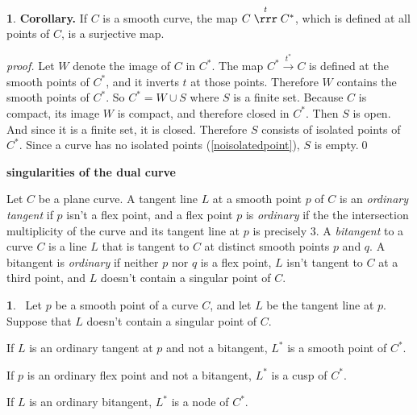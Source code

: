 \documentclass[leqno]{book}
\newcommand\Marginnote[1]{\marginnote{\hspace{-12pt}\normalfont{#1}}}
\renewcommand\theequation{\thesection.\arabic{equation}}
\newenvironment{boldequation}{\renewcommand\theequation{\textbf{\thesection.\arabic{equation}}}\equation}
   {\endequation}
\theoremstyle{definition}%
\numberwithin{equation}{section}
\theoremstyle{theorem} %
\newtheorem{proposition}[equation]{}
\newtheorem{corollary}[equation]{}
\renewenvironment{proof}{\no \emph{proof.}}{}
\begin{document}
\begin{corollary}{\bf Corollary.}
\Marginnote{cstarisimage}\label{cstarisimage}
If $C$ is a smooth curve, the map $C \stackrel t \rrr C^*$, which is
defined at all points of $C$, is a surjective map.\end{corollary}

\begin{proof}  Let $W$ denote the image of $C$ in $C^*$.
  The map $C^* \stackrel{t^*}\longrightarrow C$ is defined at the
  smooth points of $C^*$, and it inverts $t$ at those points.
  Therefore $W$ contains the smooth points of $C^*$.  So $C^* = W \cup
  S$ where $S$ is a finite set.  Because $C$ is  compact, its
  image $W$ is compact, and therefore closed in $C^*$.  Then
  $S$ is open.  And since it is a finite set, it is
  closed.  Therefore $S$ consists of isolated points
  of $C^*$.  Since a curve has no isolated points
  (\ref{noisolatedpoint}), $S$ is empty.\qed\end{proof}

\begin{boldequation}
\Marginnote{singdual}\label{singdual}
 \hspace{-8cm} 
\textbf{singularities of the dual curve}
\end{boldequation}


Let $C$ be a plane curve.  A tangent line $L$ at a
smooth point $p$ of $C$ is an {\it ordinary tangent} if $p$ isn't a flex
point, and a flex point $p$ is {\it ordinary} if the the intersection
multiplicity of the curve and its tangent line at $p$ is precisely
$3$.  A {\it bitangent} to a curve $C$ is a line $L$ that is tangent
to $C$ at distinct smooth points $p$ and $q$. A bitangent is {\it
  ordinary} if neither $p$ nor $q$ is a flex point, $L$ isn't tangent
to $C$ at a third point, and $L$ doesn't contain a singular point of
$C$. 




\begin{proposition}{}\Marginnote{dualcusp}\;\,
Let $p$ be a smooth point of a curve $C$, and let $L$ be the tangent
line at $p$.  Suppose that $L$ doesn't contain a singular point of $C$.

 If $L$ is an ordinary tangent at $p$ and not a bitangent,
 $L^*$ is a smooth point of $C^*$.

 If $p$ is an ordinary flex point and not a bitangent,
 $L^*$ is a cusp of $C^*$.

 If $L$ is an ordinary bitangent, 
$L^*$ is a node of $C^*$.
\label{dualcusp}\end{proposition}
\end{document}
